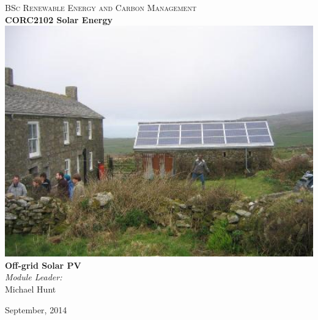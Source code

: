\documentclass[class=scrartcl, crop=false,parskip=half]{standalone}
\begin{document}
\begin{titlepage}
\vbox{ }

\vbox{ }

\begin{center}
\textsc{\Large BSc Renewable Energy and Carbon Management}\\[0.5cm]
\vbox{ }
{ \huge \bfseries CORC2102 Solar Energy}\\[1.0cm]
\includegraphics[width=1.0\textwidth]{../figures/offgridPV_Morvah.jpg}\\[1cm]

{ \huge \bfseries Off-grid Solar PV}\\[1.0cm]


\emph{Module Leader:}\\
Michael Hunt

\vfill
{\large September, 2014}
\end{center}
\end{titlepage}
\end{document}
